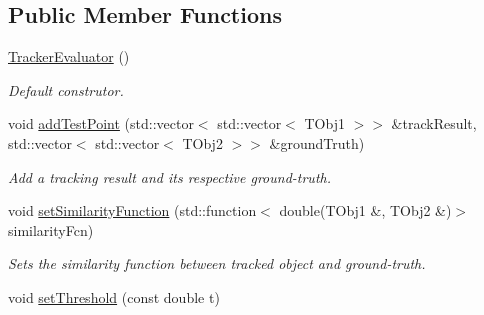 \subsection*{Public Member Functions}
\begin{DoxyCompactItemize}
\item 
\hypertarget{class_vision_core_1_1_evaluation_1_1_tracker_evaluator_a581e36aae4d36c4743eeb9ebf861b1d8}{}\hyperlink{class_vision_core_1_1_evaluation_1_1_tracker_evaluator_a581e36aae4d36c4743eeb9ebf861b1d8}{Tracker\+Evaluator} ()\label{class_vision_core_1_1_evaluation_1_1_tracker_evaluator_a581e36aae4d36c4743eeb9ebf861b1d8}

\begin{DoxyCompactList}\small\item\em Default construtor. \end{DoxyCompactList}\item 
\hypertarget{class_vision_core_1_1_evaluation_1_1_tracker_evaluator_a7501e88308f9c5dbe162e113c6ad9bc1}{}void \hyperlink{class_vision_core_1_1_evaluation_1_1_tracker_evaluator_a7501e88308f9c5dbe162e113c6ad9bc1}{add\+Test\+Point} (std\+::vector$<$ std\+::vector$<$ T\+Obj1 $>$$>$ \&track\+Result, std\+::vector$<$ std\+::vector$<$ T\+Obj2 $>$$>$ \&ground\+Truth)\label{class_vision_core_1_1_evaluation_1_1_tracker_evaluator_a7501e88308f9c5dbe162e113c6ad9bc1}

\begin{DoxyCompactList}\small\item\em Add a tracking result and its respective ground-\/truth. \end{DoxyCompactList}\item 
\hypertarget{class_vision_core_1_1_evaluation_1_1_tracker_evaluator_a0c973d5fd9480a0cca418ac96f79cf39}{}void \hyperlink{class_vision_core_1_1_evaluation_1_1_tracker_evaluator_a0c973d5fd9480a0cca418ac96f79cf39}{set\+Similarity\+Function} (std\+::function$<$ double(T\+Obj1 \&, T\+Obj2 \&)$>$ similarity\+Fcn)\label{class_vision_core_1_1_evaluation_1_1_tracker_evaluator_a0c973d5fd9480a0cca418ac96f79cf39}

\begin{DoxyCompactList}\small\item\em Sets the similarity function between tracked object and ground-\/truth. \end{DoxyCompactList}\item 
\hypertarget{class_vision_core_1_1_evaluation_1_1_tracker_evaluator_a2494e14c6a1e5bc544aa5e26816267d1}{}void \hyperlink{class_vision_core_1_1_evaluation_1_1_tracker_evaluator_a2494e14c6a1e5bc544aa5e26816267d1}{set\+Threshold} (const double t)\label{class_vision_core_1_1_evaluation_1_1_tracker_evaluator_a2494e14c6a1e5bc544aa5e26816267d1}


\end{DoxyCompactItemize}
